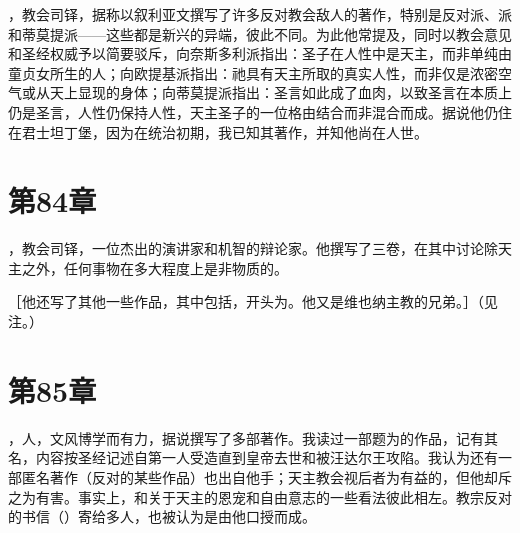 ，教会司铎，据称以叙利亚文撰写了许多反对教会敌人的著作，特别是反对派、派和蒂莫提派——这些都是新兴的异端，彼此不同。为此他常提及，同时以教会意见和圣经权威予以简要驳斥，向奈斯多利派指出：圣子在人性中是天主，而非单纯由童贞女所生的人；向欧提基派指出：祂具有天主所取的真实人性，而非仅是浓密空气或从天上显现的身体；向蒂莫提派指出：圣言如此成了血肉，以致圣言在本质上仍是圣言，人性仍保持人性，天主圣子的一位格由结合而非混合而成。据说他仍住在君士坦丁堡，因为在统治初期，我已知其著作，并知他尚在人世。\par


\section{第84章}

，教会司铎，一位杰出的演讲家和机智的辩论家。他撰写了三卷，在其中讨论除天主之外，任何事物在多大程度上是非物质的。\par

［他还写了其他一些作品，其中包括，开头为。他又是维也纳主教的兄弟。］（见注。）\par


\section{第85章}

，人，文风博学而有力，据说撰写了多部著作。我读过一部题为的作品，记有其名，内容按圣经记述自第一人受造直到皇帝去世和被汪达尔王攻陷。我认为还有一部匿名著作（反对的某些作品）也出自他手；天主教会视后者为有益的，但他却斥之为有害。事实上，和关于天主的恩宠和自由意志的一些看法彼此相左。教宗反对的书信（）寄给多人，也被认为是由他口授而成。\par


